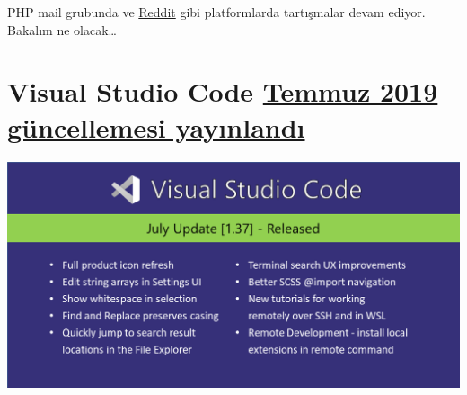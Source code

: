 \documentclass[11pt]{article}
\begin{document}
PHP mail grubunda ve \href{https://www.reddit.com/r/programming/comments/cohb0r/p/}{Reddit} gibi platformlarda tartışmalar devam ediyor.
Bakalım ne olacak\ldots{}
\section{Visual Studio Code \href{https://code.visualstudio.com/updates/v1\_37}{Temmuz 2019 güncellemesi yayınlandı}}
\label{sec:orgb45ba88}
\begin{center}
\includegraphics[width=.9\linewidth]{gorseller/vscode-temmuz2019.png}
\end{center}
\end{document}
